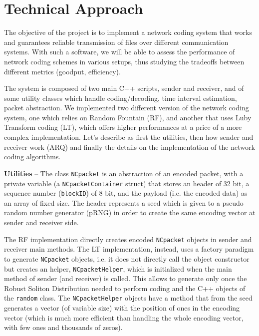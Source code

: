\section{Technical Approach}\label{sec:impl}
\setlength{\abovecaptionskip}{10pt plus 3pt minus 2pt}

The objective of the project is to implement a network coding system that works and guarantees reliable transmission of files over different communication systems. With such a software, we will be able to assess the performance of network coding schemes in various setups, thus studying the tradeoffs between different metrics (goodput, efficiency).

The system is composed of two main C++ scripts, sender and receiver, and of some utility classes which handle coding/decoding, time interval estimation, packet abstraction. We implemented two different version of the network coding system, one which relies on Random Fountain (RF), and another that uses Luby Transform coding (LT), which offers higher performances at a price of a more complex implementation. Let's describe as first the utilities, then how sender and receiver work (ARQ) and finally the details on the implementation of the network coding algorithms.

\textbf{Utilities} -- The class \texttt{NCpacket} is an abstraction of an encoded packet, with a private variable (a \newline \texttt{NCpacketContainer} struct) that stores an header of 32 bit, a sequence number (\texttt{blockID}) of 8 bit, and the payload (i.e. the encoded data) as an array of fixed size. 
The header represents a seed which is given to a pseudo random number generator (pRNG) in order to create the same encoding vector at sender and receiver side. 

The RF implementation directly creates encoded \texttt{NCpacket} objects in sender and receiver main methods.
The LT implementation, instead, uses a factory paradigm to generate \texttt{NCpacket} objects, i.e. it does not directly call the object constructor but creates an helper, \texttt{NCpacketHelper}, which is initialized when the main method of sender (and receiver) is called. This allows to generate only once the Robust Soliton Distribution needed to perform coding and the C++ objects of the \texttt{random} class. The \texttt{NCpacketHelper} objects have a method that from the seed generates a vector (of variable size) with the position of ones in the encoding vector (which is much more efficient than handling the whole encoding vector, with few ones and thousands of zeros).

